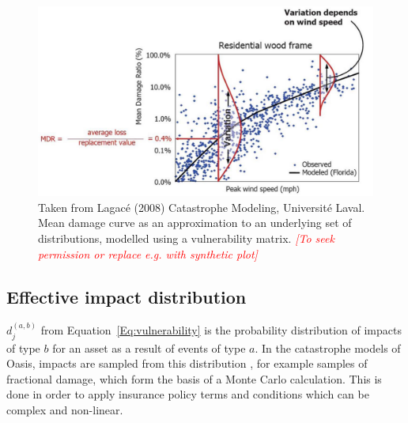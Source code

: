\documentclass[a4paper,11pt]{extarticle} %
\begin{document}
{\begin{figure}[ht]
\begin{framed}
        \includegraphics[width=\textwidth]{plots/vulnerability_lagace_2008.png}

    \end{framed}

    \footnotesize

    \renewcommand{\arraystretch}{1.01}

    \vspace{-3ex}


    \vspace{-0.5ex}

    \caption{\small Taken from Lagacé (2008) Catastrophe Modeling, Université Laval. Mean damage curve as an approximation to an underlying set of distributions, modelled using a vulnerability matrix. {\textcolor{red}{\emph{[To seek permission or replace e.g. with synthetic plot]}}}}
    \label{Fig:vulnerability_matrix}

\end{figure}




\subsection{Effective impact distribution}
$d^{(a,b)}_j$ from Equation~\ref{Eq:vulnerability} is the probability distribution of impacts of type $b$ for an asset as a result of events of type $a$. In the catastrophe models of Oasis, impacts are sampled from this distribution \cite{OasisFinancialModule}, for example samples of fractional damage, which form the basis of a Monte Carlo calculation. This is done in order to apply insurance policy terms and conditions which can be complex and non-linear.

}
\end{document}
